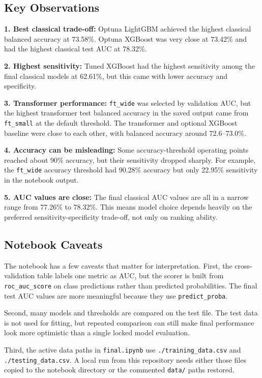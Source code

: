 \documentclass[10pt,twocolumn]{article}
\begin{document}
\subsection{Key Observations}

\textbf{1. Best classical trade-off:}
Optuna LightGBM achieved the highest classical balanced accuracy at 73.58\%. Optuna XGBoost was very close at 73.42\% and had the highest classical test AUC at 78.32\%.

\textbf{2. Highest sensitivity:}
Tuned XGBoost had the highest sensitivity among the final classical models at 62.61\%, but this came with lower accuracy and specificity.

\textbf{3. Transformer performance:}
\texttt{ft\_wide} was selected by validation AUC, but the highest transformer test balanced accuracy in the saved output came from \texttt{ft\_small} at the default threshold. The transformer and optional XGBoost baseline were close to each other, with balanced accuracy around 72.6--73.0\%.

\textbf{4. Accuracy can be misleading:}
Some accuracy-threshold operating points reached about 90\% accuracy, but their sensitivity dropped sharply. For example, the \texttt{ft\_wide} accuracy threshold had 90.28\% accuracy but only 22.95\% sensitivity in the notebook output.

\textbf{5. AUC values are close:}
The final classical AUC values are all in a narrow range from 77.26\% to 78.32\%. This means model choice depends heavily on the preferred sensitivity-specificity trade-off, not only on ranking ability.

\subsection{Notebook Caveats}

The notebook has a few caveats that matter for interpretation. First, the cross-validation table labels one metric as AUC, but the scorer is built from \texttt{roc\_auc\_score} on class predictions rather than predicted probabilities. The final test AUC values are more meaningful because they use \texttt{predict\_proba}.

Second, many models and thresholds are compared on the test file. The test data is not used for fitting, but repeated comparison can still make final performance look more optimistic than a single locked model evaluation.

Third, the active data paths in \texttt{final.ipynb} use \texttt{./training\_data.csv} and \texttt{./testing\_data.csv}. A local run from this repository needs either those files copied to the notebook directory or the commented \texttt{data/} paths restored.
\end{document}
